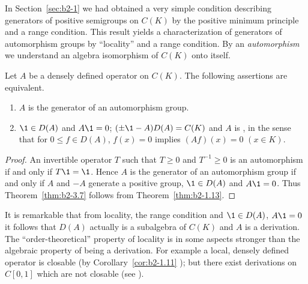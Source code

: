In Section~\ref{sec:b2-1} we had obtained a very simple condition describing generators of positive semigroups on $C(K)$ by the positive minimum principle and a range condition.
This result yields a characterization of generators of automorphism groups by \enquote{locality} and a range condition.
By an \emph{automorphism} we understand an algebra isomorphism of\/ $C(K)$ onto itself.
\begin{theorem}\label{thm:b2-3.7}
Let $A$ be a densely defined operator on $C(K)$.
The following assertions are equivalent.
\begin{enumerate}[\upshape (a)]
\item \label{thm:b2-3.7-1}
$A$ is the generator of an automorphism group.
\item \label{thm:b2-3.7-2}
$\1 \in D(A)$ and $A\1 = 0$; $(\pm \1 - A)D(A) = C(K)$ and $A$ is , in the sense that for $0 \leq f \in D(A)$, $f(x) = 0$ implies $(Af)(x) = 0$ $(x \in K)$.
\end{enumerate}
\end{theorem}
\begin{proof}
An invertible operator $T$ such that $T \geq 0$ and $T^{-1} \geq 0$ is an automorphism if and only if\/ $T\1 = \1$.
Hence $A$ is the generator of an automorphism group if and only if\/ $A$ and $-A$ generate a positive group, $\1 \in D(A)$ and $A\1 = 0$.
Thus Theorem~\ref{thm:b2-3.7} follows from Theorem~\ref{thm:b2-1.13}.
\end{proof}
\begin{remark*}\label{rem:b2-3.7a}
It is remarkable that from locality, the range condition and $\1 \in D(A)$, $A\1 = 0$ it follows that $D(A)$ actually is a subalgebra of\/ $C(K)$ and $A$ is a derivation.
The \enquote{order-theoretical} property of locality is in some aspects stronger than the algebraic property of being a derivation.
For example a local, densely defined operator is closable (by Corollary~\ref{cor:b2-1.11} ); but there exist derivations on $C[0,1]$ which are not closable (see \textcite{brattelirobinson:1975}).
\end{remark*}
